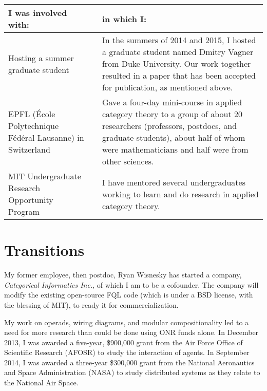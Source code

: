 \documentclass[11pt,oneside,article]{memoir}
\begin{document}
\noindent\begin{tabular}{p{1.9in}lp{3.4in}}
\textbf{I was involved with:}&&\textbf{in which I:}\\\hline
Hosting a summer graduate student
&&
In the summers of 2014 and 2015, I hosted a graduate student named Dmitry Vagner from Duke University. Our work together resulted in a paper that has been accepted for publication, as mentioned above.
\\
EPFL (\'{E}cole Polytechnique F\'ed\'eral Lausanne) in Switzerland
&&
Gave a four-day mini-course in applied category theory to a group of about 20 researchers (professors, postdocs, and graduate students), about half of whom were mathematicians and half were from other sciences. 
\\
MIT Undergraduate Research Opportunity Program
&&
I have mentored several undergraduates working to learn and do research in applied category theory.
\\
\end{tabular}

\section{Transitions}\label{sec:transitions}

My former employee, then postdoc, Ryan Wisnesky has started a company, \emph{Categorical Informatics Inc.}, of which I am to be a cofounder. The company will modify the existing open-source FQL code (which is under a BSD license, with the blessing of MIT), to ready it for commercialization.

My work on operads, wiring diagrams, and modular compositionality led to a need for more research than could be done using ONR funds alone. In December 2013, I was awarded a five-year, \$900,000 grant from the Air Force Office of Scientific Research (AFOSR) to study the interaction of agents. In September 2014, I was awarded a three-year \$300,000 grant from the National Aeronautics and Space Administration (NASA) to study distributed systems as they relate to the National Air Space.
\end{document}
